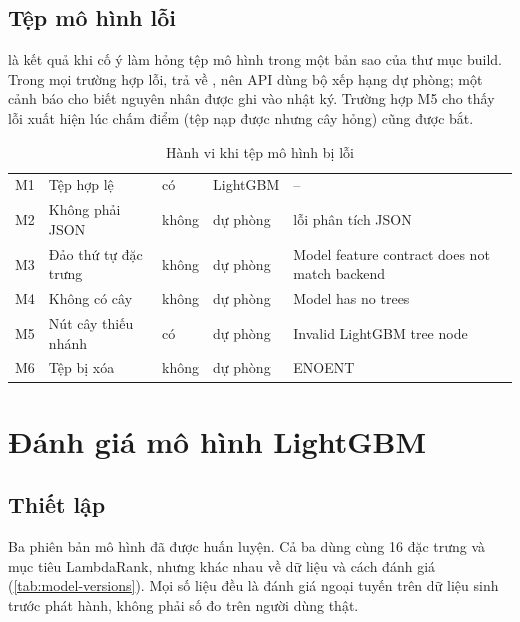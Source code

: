\subsection{Tệp mô hình lỗi}

 là kết quả khi cố ý làm hỏng tệp mô hình trong một bản sao của thư mục build. Trong mọi trường hợp lỗi,  trả về , nên API dùng bộ xếp hạng dự phòng; một cảnh báo cho biết nguyên nhân được ghi vào nhật ký. Trường hợp M5 cho thấy lỗi xuất hiện lúc chấm điểm (tệp nạp được nhưng cây hỏng) cũng được bắt.

\begin{table}[H]
\centering
\caption{Hành vi khi tệp mô hình bị lỗi}\label{tab:test-artifact}
\begin{rtable}
\begin{tabular}{|C{1.0cm}|L{3.6cm}|C{1.6cm}|L{3.2cm}|L{4.6cm}|}
\hline
{} &  &  &  &  \\ \hline
M1 & Tệp hợp lệ & có & LightGBM & -- \\ \hline
M2 & Không phải JSON & không & dự phòng & lỗi phân tích JSON \\ \hline
M3 & Đảo thứ tự đặc trưng & không & dự phòng & Model feature contract does not match backend \\ \hline
M4 & Không có cây & không & dự phòng & Model has no trees \\ \hline
M5 & Nút cây thiếu nhánh & có & dự phòng & Invalid LightGBM tree node \\ \hline
M6 & Tệp bị xóa & không & dự phòng & ENOENT \\ \hline
\end{tabular}
\end{rtable}
\end{table}

\section{Đánh giá mô hình LightGBM}\label{sec:eval-model}

\subsection{Thiết lập}

Ba phiên bản mô hình đã được huấn luyện. Cả ba dùng cùng 16 đặc trưng và mục tiêu LambdaRank, nhưng khác nhau về dữ liệu và cách đánh giá (\cref{tab:model-versions}). Mọi số liệu đều là đánh giá ngoại tuyến trên dữ liệu sinh trước phát hành, không phải số đo trên người dùng thật.

